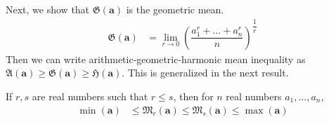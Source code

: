 \documentclass{subfile}
\begin{document}
	Next, we show that $\mathfrak{G}(\mathbf{a})$ is the geometric mean.
		\begin{align*}
			\mathfrak{G}(\mathbf{a})
				& = \lim\limits_{r\to0}\left(\dfrac{a_1^r+\ldots+a_n^r}{n}\right)^{\dfrac{1}{r}}
		\end{align*}
	Then we can write arithmetic-geometric-harmonic mean inequality as $\mathfrak{A}(\mathbf{a})\geq\mathfrak{G}(\mathbf{a})\geq \mathfrak{H}(\mathbf{a})$. This is generalized in the next result.
		\begin{theorem}
			If $r,s$ are real numbers such that $r\leq s$, then for $n$ real numbers $a_1,\ldots,a_n$,
				\begin{align*}
					\min{(\mathbf{a})}
						& \leq \mathfrak{M}_r(\mathbf{a})\leq \mathfrak{M}_s(\mathbf{a})\leq\max{(\mathbf{a})}
				\end{align*}
		\end{theorem}
\end{document}
